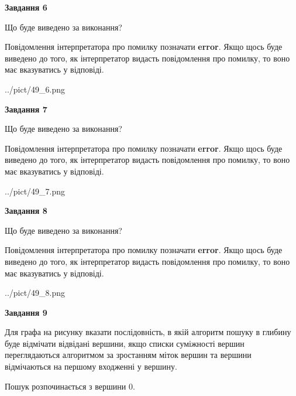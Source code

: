 \documentclass[12pt, ukrainian]{article}
\begin{document}
{\begin {large}
{\begin {center}\textbf{Завдання 6}\end {center}}\par
Що буде виведено за виконання?

Повідомлення інтерпретатора про помилку позначати \textbf{error}.
Якщо щось буде виведено до того, як інтерпретатор видасть повідомлення про помилку, 
то воно має вказуватись у відповіді. \par


\begin{center}
	{../pict/49_6.png}
\end{center}
\newpage

{\begin {center}\textbf{Завдання 7}\end {center}}\par
Що буде виведено за виконання?

Повідомлення інтерпретатора про помилку позначати \textbf{error}.
Якщо щось буде виведено до того, як інтерпретатор видасть повідомлення про помилку, 
то воно має вказуватись у відповіді. \par


\begin{center}
	{../pict/49_7.png}
\end{center}
\newpage

{\begin {center}\textbf{Завдання 8}\end {center}}\par
Що буде виведено за виконання?

Повідомлення інтерпретатора про помилку позначати \textbf{error}.
Якщо щось буде виведено до того, як інтерпретатор видасть повідомлення про помилку, 
то воно має вказуватись у відповіді. \par


\begin{center}
	{../pict/49_8.png}
\end{center}
\newpage

{\begin {center}\textbf{Завдання 9}\end {center}}\par
Для графа на рисунку вказати послідовність, в якій алгоритм пошуку в глибину буде відмічати відвідані вершини, якщо списки суміжності вершин переглядаються алгоритмом за зростанням міток вершин та вершини відмічаються на першому вход\-женні у вершину.\par
Пошук розпочинається з вершини 0.\par


\end{large}}
\end{document}
